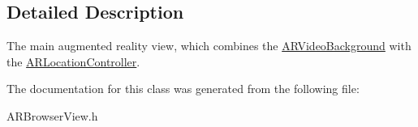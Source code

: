 \subsection{Detailed Description}
The main augmented reality view, which combines the \hyperlink{interface_a_r_video_background}{ARVideoBackground} with the \hyperlink{interface_a_r_location_controller}{ARLocationController}. 

The documentation for this class was generated from the following file:\begin{DoxyCompactItemize}
\item 
ARBrowserView.h\end{DoxyCompactItemize}
